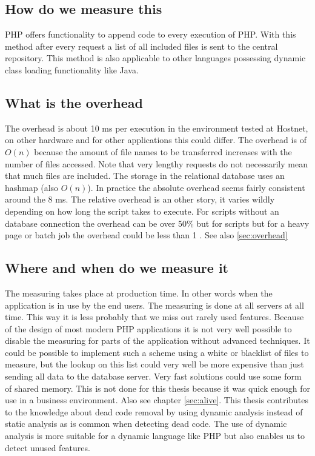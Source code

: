 \subsection*{How do we measure this}
PHP offers functionality to append code to every execution of PHP. With this method after every request a list of all included files is sent to the central repository. This method is also applicable to other languages possessing dynamic class loading functionality like Java.

\subsection*{What is the overhead}
The overhead is about 10 ms per execution in the environment tested at Hostnet, on other hardware and for other applications this could differ. The overhead is of $O(n)$ because the amount of file names to be transferred increases with the number of files accessed. Note that very lengthy requests do not necessarily mean that much files are included.  The storage in the relational database uses an hashmap (also $O(n)$). In practice the absolute overhead seems fairly consistent around the 8 ms. The relative overhead is an other story, it varies wildly depending on how long the script takes to execute. For scripts without an database connection the overhead can be over 50\% but for scripts but for a heavy page or batch job the overhead could be less than 1 \permil. See also \ref{sec:overhead}

\subsection*{Where and when do we measure it}
The measuring takes place at production time. In other words when the application is in use by the end users. The measuring is done at all servers at all time. This way it is less probably that we miss out rarely used features. Because of the design of most modern PHP applications it is not very well possible to disable the measuring for parts of the application without advanced techniques. It could be possible to implement such a scheme using a white or blacklist of files to measure, but the lookup on this list could very well be more expensive than just sending all data to the database server. Very fast solutions could use some form of shared memory. This is not done for this thesis because it was quick enough for use in a business environment. Also see chapter \ref{sec:alive}. This thesis contributes to the knowledge about dead code removal by using dynamic analysis instead of static analysis as is common when detecting dead code. The use of dynamic analysis is more suitable for a dynamic language like PHP but also enables us to detect unused features.

